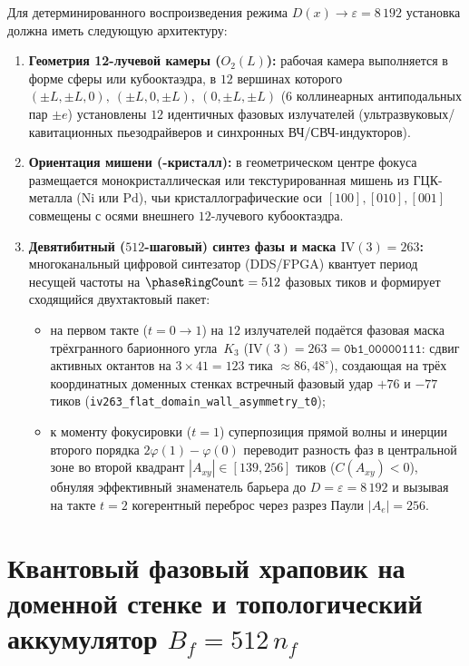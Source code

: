 Для детерминированного воспроизведения режима $D(x) \to \varepsilon = 8\,192$ установка должна иметь следующую архитектуру:
\begin{enumerate}[leftmargin=*]
\item \textbf{Геометрия 12-лучевой камеры ($O_2(L)$):}
  рабочая камера выполняется в форме сферы или кубооктаэдра, в $12$ вершинах которого $(\pm L, \pm L, 0),\ (\pm L, 0, \pm L),\ (0, \pm L, \pm L)$ ($6$ коллинеарных антиподальных пар $\pm e$) установлены $12$ идентичных фазовых излучателей (ультразвуковых/кавитационных пьезодрайверов и синхронных ВЧ/СВЧ-индукторов).
\item \textbf{Ориентация мишени (\latGCKshort-кристалл):}
  в геометрическом центре фокуса размещается монокристаллическая или текстурированная мишень из ГЦК-металла ($\mathrm{Ni}$ или $\mathrm{Pd}$), чьи кристаллографические оси $[100],[010],[001]$ совмещены с осями внешнего $12$-лучевого кубооктаэдра.
\item \textbf{Девятибитный ($512$-шаговый) синтез фазы и маска $\mathrm{IV}(3) = 263$:}
  многоканальный цифровой синтезатор (DDS/FPGA) квантует период несущей частоты на $\phaseRingCount = 512$ фазовых тиков и формирует сходящийся двухтактовый пакет:
  \begin{itemize}[nosep,leftmargin=*]
  \item на первом такте ($t=0\to 1$) на $12$ излучателей подаётся фазовая маска трёхгранного барионного угла~$K_3$ ($\mathrm{IV}(3) = 263 = \texttt{0b1\_00000111}$: сдвиг активных октантов на $3\times 41 = 123$ тика $\approx 86{,}48^\circ$), создающая на трёх координатных доменных стенках встречный фазовый удар $+76$ и $-77$ тиков (\texttt{iv263\_flat\_domain\_wall\_asymmetry\_t0});
  \item к моменту фокусировки ($t=1$) суперпозиция прямой волны и инерции второго порядка $2\varphi(1)-\varphi(0)$ переводит разность фаз в центральной зоне во второй квадрант $|A_{xy}| \in [139, 256]$ тиков ($C(A_{xy}) < 0$), обнуляя эффективный знаменатель барьера до $D = \varepsilon = 8\,192$ и вызывая на такте $t=2$ когерентный переброс через разрез Паули $|A_e| = 256$.
  \end{itemize}
\end{enumerate}

\chapter{Квантовый фазовый храповик на доменной стенке и топологический аккумулятор \texorpdfstring{$B_f = 512\,n_f$}{B\_f = 512 n\_f}}
\label{ch:applied-phase-ratchet-and-vortex-battery}

